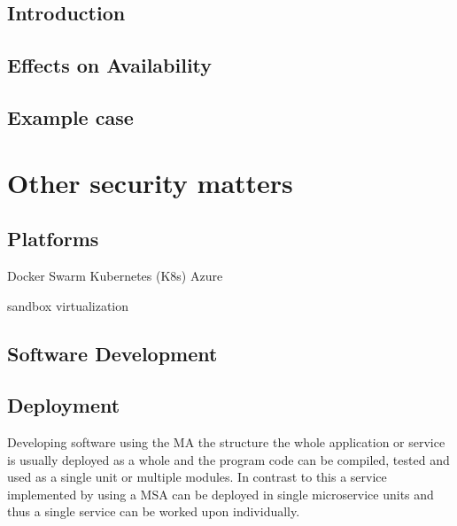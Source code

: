 \subsection{Introduction}
\begin{sloppypar}

\end{sloppypar}

\subsection{Effects on Availability}
\begin{sloppypar}

\end{sloppypar}

\subsection{Example case}
\begin{sloppypar}

\end{sloppypar}




\section{Other security matters}
    \subsection{Platforms}
        \begin{sloppypar}

        \end{sloppypar}
    
    Docker Swarm
    Kubernetes (K8s)
    Azure

    sandbox
    virtualization 

    \subsection{Software Development}
    \subsection{Deployment}
        \begin{sloppypar}

            Developing software using the MA the structure the whole application or service 
            is usually deployed as a whole and the program code can be compiled, tested and
            used as a single unit or multiple modules. In contrast to this a service implemented 
            by using a MSA can be deployed in single microservice units and thus a single service 
            can be worked upon individually.
        
        \end{sloppypar}






